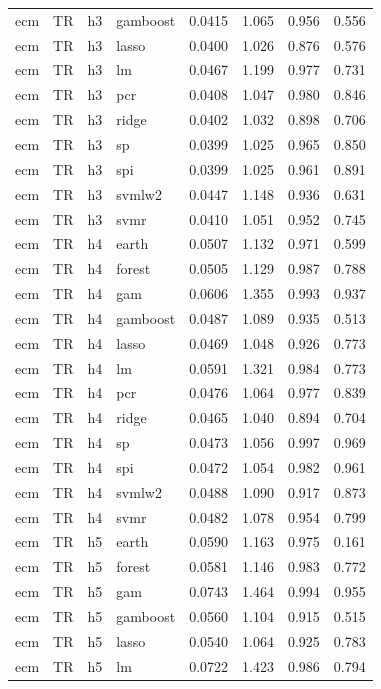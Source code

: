 \begin{ThreePartTable}
\begin{longtable}[t]{llclcccc}
ecm & TR & h3 & gamboost & 0.0415 & 1.065 & 0.956 & 0.556\\
ecm & TR & h3 & lasso & 0.0400 & 1.026 & 0.876 & 0.576\\
ecm & TR & h3 & lm & 0.0467 & 1.199 & 0.977 & 0.731\\
ecm & TR & h3 & pcr & 0.0408 & 1.047 & 0.980 & 0.846\\
ecm & TR & h3 & ridge & 0.0402 & 1.032 & 0.898 & 0.706\\
ecm & TR & h3 & sp & 0.0399 & 1.025 & 0.965 & 0.850\\
ecm & TR & h3 & spi & 0.0399 & 1.025 & 0.961 & 0.891\\
ecm & TR & h3 & svmlw2 & 0.0447 & 1.148 & 0.936 & 0.631\\
ecm & TR & h3 & svmr & 0.0410 & 1.051 & 0.952 & 0.745\\
\addlinespace
ecm & TR & h4 & earth & 0.0507 & 1.132 & 0.971 & 0.599\\
ecm & TR & h4 & forest & 0.0505 & 1.129 & 0.987 & 0.788\\
ecm & TR & h4 & gam & 0.0606 & 1.355 & 0.993 & 0.937\\
ecm & TR & h4 & gamboost & 0.0487 & 1.089 & 0.935 & 0.513\\
ecm & TR & h4 & lasso & 0.0469 & 1.048 & 0.926 & 0.773\\
ecm & TR & h4 & lm & 0.0591 & 1.321 & 0.984 & 0.773\\
ecm & TR & h4 & pcr & 0.0476 & 1.064 & 0.977 & 0.839\\
ecm & TR & h4 & ridge & 0.0465 & 1.040 & 0.894 & 0.704\\
ecm & TR & h4 & sp & 0.0473 & 1.056 & 0.997 & 0.969\\
ecm & TR & h4 & spi & 0.0472 & 1.054 & 0.982 & 0.961\\
ecm & TR & h4 & svmlw2 & 0.0488 & 1.090 & 0.917 & 0.873\\
ecm & TR & h4 & svmr & 0.0482 & 1.078 & 0.954 & 0.799\\
\addlinespace
ecm & TR & h5 & earth & 0.0590 & 1.163 & 0.975 & 0.161\\
ecm & TR & h5 & forest & 0.0581 & 1.146 & 0.983 & 0.772\\
ecm & TR & h5 & gam & 0.0743 & 1.464 & 0.994 & 0.955\\
ecm & TR & h5 & gamboost & 0.0560 & 1.104 & 0.915 & 0.515\\
ecm & TR & h5 & lasso & 0.0540 & 1.064 & 0.925 & 0.783\\
ecm & TR & h5 & lm & 0.0722 & 1.423 & 0.986 & 0.794\\

\end{longtable}
\end{ThreePartTable}
